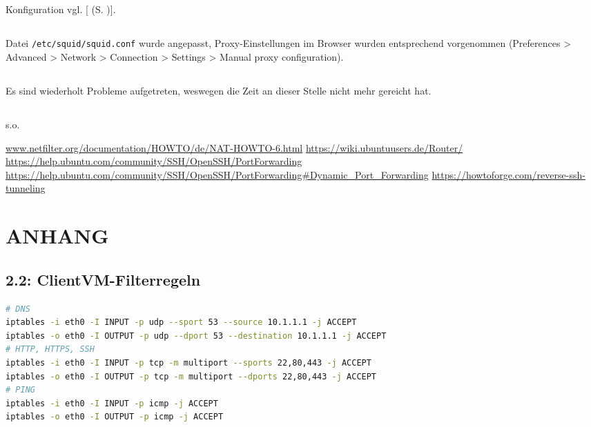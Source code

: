 \documentclass[twoside]{article}
\newcommand{\ttt}[1]{%
	\texttt{#1}%
}
\newcommand{\mref}[1]{[\nameref{#1} (S. \pageref{#1})]}
\begin{document}
	\subsection{}
	\label{ssec:6.3}
	Konfiguration vgl. \mref{a6-3}.
	\subsection{}
	\label{ssec:6.4}
	Datei \ttt{/etc/squid/squid.conf} wurde angepasst, Proxy-Einstellungen im Browser wurden entsprechend vorgenommen (Preferences > Advanced > Network > Connection > Settings > Manual proxy configuration).
	\subsection{}
	\label{ssec:6.5}
	Es sind wiederholt Probleme aufgetreten, weswegen die Zeit an dieser Stelle nicht mehr gereicht hat.
	\subsection{}
	\label{ssec:6.6}
	s.o.


\begin{thebibliography}{1}
			\url{www.netfilter.org/documentation/HOWTO/de/NAT-HOWTO-6.html}
	\url{https://wiki.ubuntuusers.de/Router/}
	\url{https://help.ubuntu.com/community/SSH/OpenSSH/PortForwarding}
	\url{https://help.ubuntu.com/community/SSH/OpenSSH/PortForwarding\#Dynamic\_Port\_Forwarding}
	\url{https://howtoforge.com/reverse-ssh-tunneling}
\end{thebibliography}
\newpage
\section*{ANHANG}
\label{sec:app}
	\subsection*{2.2: ClientVM-Filterregeln}
	\label{2.2-1}
	\begin{lstlisting}[language=bash]
# DNS
iptables -i eth0 -I INPUT -p udp --sport 53 --source 10.1.1.1 -j ACCEPT
iptables -o eth0 -I OUTPUT -p udp --dport 53 --destination 10.1.1.1 -j ACCEPT
# HTTP, HTTPS, SSH
iptables -i eth0 -I INPUT -p tcp -m multiport --sports 22,80,443 -j ACCEPT
iptables -o eth0 -I OUTPUT -p tcp -m multiport --dports 22,80,443 -j ACCEPT
# PING
iptables -i eth0 -I INPUT -p icmp -j ACCEPT
iptables -o eth0 -I OUTPUT -p icmp -j ACCEPT
	\end{lstlisting}
\end{document}
